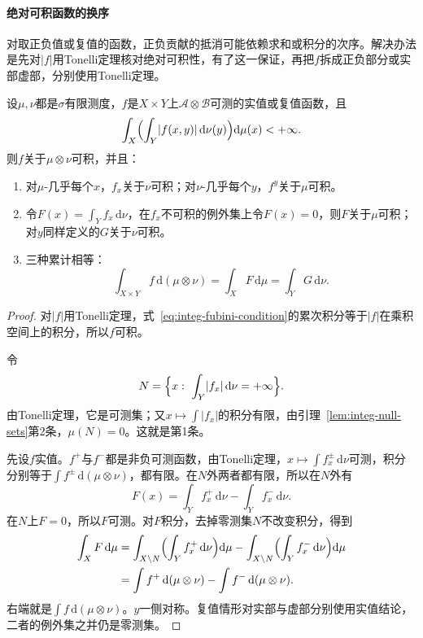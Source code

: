 \paragraph{绝对可积函数的换序}
对取正负值或复值的函数，正负贡献的抵消可能依赖求和或积分的次序。解决办法是先对$\lvert f\rvert$用Tonelli定理核对绝对可积性，有了这一保证，再把$f$拆成正负部分或实部虚部，分别使用Tonelli定理。

\begin{theorem}[Fubini定理]
\label{thm:integ-fubini}
设$\mu,\nu$都是$\sigma$有限测度，$f$是$X\times Y$上$\mathcal A\otimes\mathcal B$可测的实值或复值函数，且
\begin{equation}
 \int_X\Bigl(\int_Y\lvert f(x,y)\rvert\,\mathrm d\nu(y)\Bigr)\mathrm d\mu(x)<+\infty .
 \label{eq:integ-fubini-condition}
\end{equation}
则$f$关于$\mu\otimes\nu$可积，并且：
\begin{enumerate}
 \item 对$\mu$-几乎每个$x$，$f_x$关于$\nu$可积；对$\nu$-几乎每个$y$，$f^y$关于$\mu$可积。
 \item 令$F(x)=\int_Yf_x\,\mathrm d\nu$，在$f_x$不可积的例外集上令$F(x)=0$，则$F$关于$\mu$可积；对$y$同样定义的$G$关于$\nu$可积。
 \item 三种累计相等：
 \begin{equation}
  \int_{X\times Y}f\,\mathrm d(\mu\otimes\nu)=\int_XF\,\mathrm d\mu=\int_YG\,\mathrm d\nu .
  \label{eq:integ-fubini}
 \end{equation}
\end{enumerate}
\end{theorem}

\begin{proof}
对$\lvert f\rvert$用Tonelli定理，式~\eqref{eq:integ-fubini-condition}的累次积分等于$\lvert f\rvert$在乘积空间上的积分，所以$f$可积。

令
\[
 N=\Bigl\{x:\ \int_Y\lvert f_x\rvert\,\mathrm d\nu=+\infty\Bigr\}.
\]
由Tonelli定理，它是可测集；又$x\mapsto\int\lvert f_x\rvert$的积分有限，由引理~\ref{lem:integ-null-sets}第2条，$\mu(N)=0$。这就是第1条。

先设$f$实值。$f^+$与$f^-$都是非负可测函数，由Tonelli定理，$x\mapsto\int f^\pm_x\,\mathrm d\nu$可测，积分分别等于$\int f^\pm\,\mathrm d(\mu\otimes\nu)$，都有限。在$N$外两者都有限，所以在$N$外有
\[
 F(x)=\int_Yf^+_x\,\mathrm d\nu-\int_Yf^-_x\,\mathrm d\nu .
\]
在$N$上$F=0$，所以$F$可测。对$F$积分，去掉零测集$N$不改变积分，得到
\[
\begin{aligned}
 \int_XF\,\mathrm d\mu&=\int_{X\setminus N}\Bigl(\int_Yf^+_x\,\mathrm d\nu\Bigr)\mathrm d\mu-\int_{X\setminus N}\Bigl(\int_Yf^-_x\,\mathrm d\nu\Bigr)\mathrm d\mu\\
 &=\int f^+\,\mathrm d(\mu\otimes\nu)-\int f^-\,\mathrm d(\mu\otimes\nu).
\end{aligned}
\]
右端就是$\int f\,\mathrm d(\mu\otimes\nu)$。$y$一侧对称。复值情形对实部与虚部分别使用实值结论，二者的例外集之并仍是零测集。
\end{proof}

